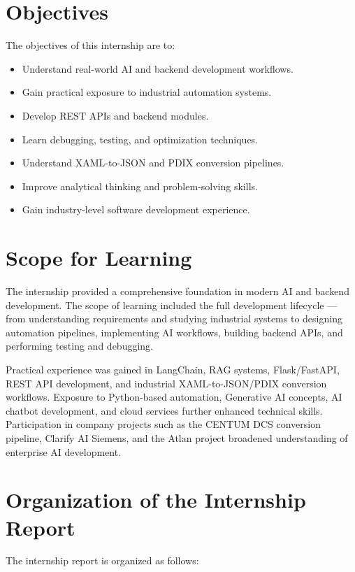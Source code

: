 \documentclass[12pt,a4paper]{report}
\begin{document}
\section{Objectives}

The objectives of this internship are to:
\begin{itemize}[leftmargin=1.5cm]
    \item Understand real-world AI and backend development workflows.
    \item Gain practical exposure to industrial automation systems.
    \item Develop REST APIs and backend modules.
    \item Learn debugging, testing, and optimization techniques.
    \item Understand XAML-to-JSON and PDIX conversion pipelines.
    \item Improve analytical thinking and problem-solving skills.
    \item Gain industry-level software development experience.
\end{itemize}

\section{Scope for Learning}

The internship provided a comprehensive foundation in modern AI and backend development. The scope of learning included the full development lifecycle — from understanding requirements and studying industrial systems to designing automation pipelines, implementing AI workflows, building backend APIs, and performing testing and debugging.

Practical experience was gained in LangChain, RAG systems, Flask/FastAPI, REST API development, and industrial XAML-to-JSON/PDIX conversion workflows. Exposure to Python-based automation, Generative AI concepts, AI chatbot development, and cloud services further enhanced technical skills. Participation in company projects such as the CENTUM DCS conversion pipeline, Clarify AI Siemens, and the Atlan project broadened understanding of enterprise AI development.

\section{Organization of the Internship Report}

The internship report is organized as follows:
\end{document}

